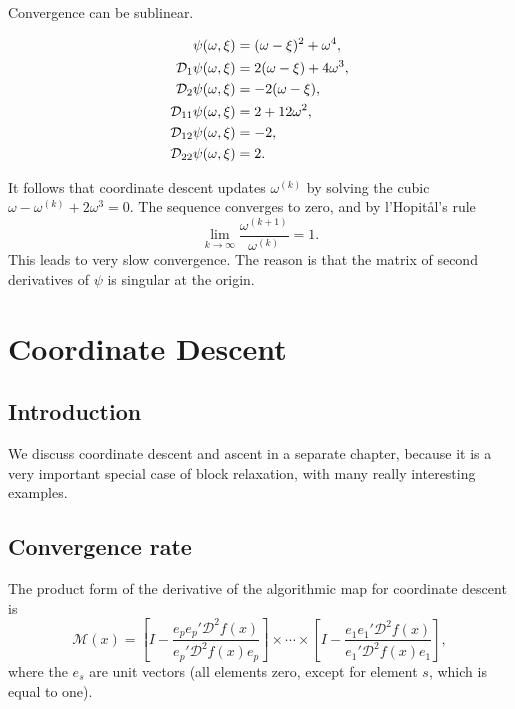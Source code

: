 \documentclass[
  12pt,
]{book}
\begin{document}
Convergence can be sublinear.

\begin{align*}
\psi(\omega,\xi)&=(\omega-\xi)^2+\omega^4,\notag \\
\mathcal{D}_1\psi(\omega,\xi)&=2(\omega-\xi)+4\omega^3,\notag\\
\mathcal{D}_2\psi(\omega,\xi)&=-2(\omega-\xi),\notag\\
\mathcal{D}_{11}\psi(\omega,\xi)&=2+12\omega^2,\notag\\
\mathcal{D}_{12}\psi(\omega,\xi)&=-2,\notag\\
\mathcal{D}_{22}\psi(\omega,\xi)&=2.\notag
\end{align*}

It follows that coordinate descent updates \(\omega^{(k)}\) by solving the cubic
\(\omega-\omega^{(k)}+2\omega^3=0.\)
The sequence converges to zero, and by l'Hopitål's rule
\[
\lim_{k\rightarrow\infty}{\frac{\omega^{(k+1)}}{\omega^{(k)}}}=1.
\]
This leads to very slow convergence. The reason is that
the matrix of second derivatives of \(\psi\) is singular at the origin.

\hypertarget{coordinatedescent}{%
\chapter{Coordinate Descent}\label{coordinatedescent}}

\hypertarget{coordinatedescent:introduction}{%
\section{Introduction}\label{coordinatedescent:introduction}}

We discuss coordinate descent and ascent in a separate chapter, because it is a very important special case of block relaxation, with many really interesting examples.

\hypertarget{coordinatedescent:convergencerate}{%
\section{Convergence rate}\label{coordinatedescent:convergencerate}}

The product form of the derivative of the algorithmic map for coordinate descent is
\[
\mathcal{M}(x)=\left[I-\frac{e_pe_p'\mathcal{D}^2f(x)}
{e_p'\mathcal{D}^2f(x)e_p}\right]
\times\cdots\times
\left[I-\frac{e_1e_1'\mathcal{D}^2f(x)}{e_1'\mathcal{D}^2f(x)e_1}\right],
\]
where the \(e_s\) are unit vectors (all elements zero, except for element \(s\), which is equal to one).
\end{document}
